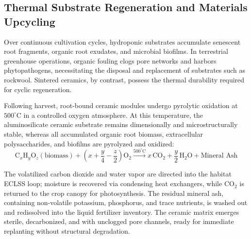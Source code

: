 \subsection{Thermal Substrate Regeneration and Materials Upcycling}
\label{subsec:thermal_regeneration}

Over continuous cultivation cycles, hydroponic substrates accumulate senescent root fragments, organic root exudates, and microbial biofilms\cite{ming1989lunar}. In terrestrial greenhouse operations, organic fouling clogs pore networks and harbors phytopathogens, necessitating the disposal and replacement of substrates such as rockwool\cite{ming1989lunar,wamelink2019crop}. Sintered ceramics, by contrast, possess the thermal durability required for cyclic regeneration\cite{ming1989lunar,barta1994thermal}.

Following harvest, root-bound ceramic modules undergo pyrolytic oxidation at $500^\circ\mathrm{C}$ in a controlled oxygen atmosphere\cite{ming1989lunar,barta1994thermal}. At this temperature, the aluminosilicate ceramic substrate remains dimensionally and microstructurally stable, whereas all accumulated organic root biomass, extracellular polysaccharides, and biofilms are pyrolyzed and oxidized\cite{ming1989lunar,barta1994thermal}:
\begin{equation}
    \mathrm{C}_x\mathrm{H}_y\mathrm{O}_z (\text{biomass}) + \left(x + \frac{y}{4} - \frac{z}{2}\right)\mathrm{O}_2 \xrightarrow{500^\circ\mathrm{C}} x\,\mathrm{CO}_2 + \frac{y}{2}\,\mathrm{H}_2\mathrm{O} + \text{Mineral Ash}
    \label{eq:pyrolytic_bakeout}
\end{equation}

The volatilized carbon dioxide and water vapor are directed into the habitat ECLSS loop; moisture is recovered via condensing heat exchangers, while $\mathrm{CO}_2$ is returned to the crop canopy for photosynthesis\cite{wheeler2017agriculture,ming1989lunar,barta1994thermal}. The residual mineral ash, containing non-volatile potassium, phosphorus, and trace nutrients, is washed out and redissolved into the liquid fertilizer inventory\cite{ming1989lunar,hendrix2019measurement}. The ceramic matrix emerges sterile, decarbonized, and with unclogged pore channels, ready for immediate replanting without structural degradation\cite{ming1989lunar}.

